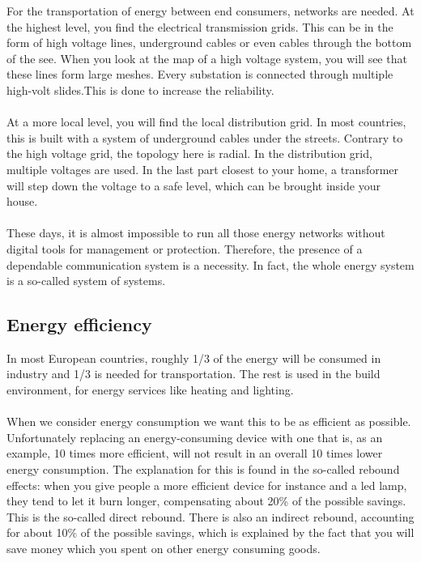 \documentclass[../summary.tex]{subfiles}
\begin{document}
	For the transportation of energy between end consumers, networks are needed. At the highest level, you find the electrical transmission grids. This can be in the form of high voltage lines, underground cables or even cables through the bottom of the see. When you look at the map of a high voltage system, you will see that these lines form large meshes. Every substation is connected through multiple high-volt slides.This is done to increase the reliability. 
	\\\\
	At a more local level, you will find the local distribution grid. In most countries, this is built with a system of underground cables under the streets. Contrary to the high voltage grid, the topology here is radial. In the distribution grid, multiple voltages are used. In the last part closest to your home, a transformer will step down the voltage to a safe level, which can be brought inside your house. 
	\\\\
	These days, it is almost impossible to run all those energy networks without digital tools for management or protection. Therefore, the presence of a dependable communication system is a necessity. In fact, the whole energy system is a so-called system of systems.
	
	\subsection{Energy efficiency}
	
	In most European countries, roughly 1/3 of the energy will be consumed in industry and 1/3 is needed for transportation. The rest is used in the build environment, for energy services like heating and lighting. 
	\\\\
	When we consider energy consumption we want this to be as efficient as possible. Unfortunately replacing an energy-consuming device with one that is, as an example, 10 times more efficient, will not result in an overall 10 times lower energy consumption. The explanation for this is found in the so-called rebound effects: when you give people a more efficient device for instance and a led lamp, they tend to let it burn longer, compensating about 20\% of the possible savings. This is the so-called direct rebound. There is also an indirect rebound, accounting for about 10\% of the possible savings, which is explained by the fact that you will save money which you spent on other energy consuming goods.  
	
\end{document}
